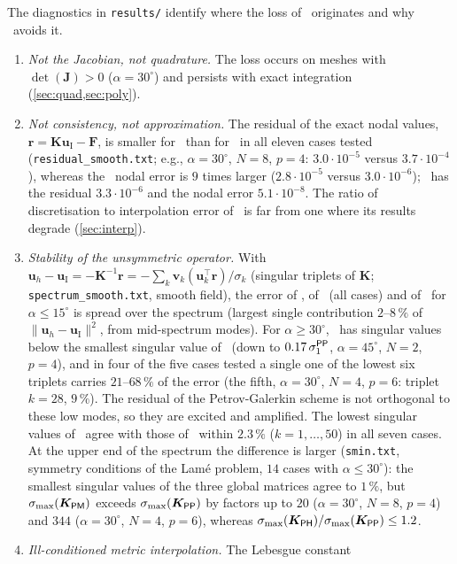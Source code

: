 The diagnostics in \texttt{results/} identify where the loss of \PM\ originates and why \PH\
avoids it.
\begin{enumerate}
\item \emph{Not the Jacobian, not quadrature.} The loss occurs on meshes with
  $\det(\bm J)>0$ ($\alpha=30^\circ$) and persists with exact integration
  (\cref{sec:quad,sec:poly}).
\item \emph{Not consistency, not approximation.} The residual of the exact nodal values,
  $\bm r=\bm K\bm u_{\mathrm I}-\bm F$, is smaller for \PM\ than for \PP\ in all eleven cases tested
  (\texttt{residual\_smooth.txt}; e.g., $\alpha=30^\circ$, $N=8$, $p=4$: $3.0\cdot10^{-5}$ versus
  $3.7\cdot10^{-4}$), whereas the \PM\ nodal error is $9$ times larger ($2.8\cdot10^{-5}$ versus
  $3.0\cdot10^{-6}$); \PH\ has the residual $3.3\cdot10^{-6}$ and the nodal error $5.1\cdot10^{-8}$. The
  ratio of discretisation to interpolation error of \PM\ is far from one where its results
  degrade (\cref{sec:interp}).
\item \emph{Stability of the unsymmetric operator.} With $\bm u_h-\bm u_{\mathrm I}=-\bm K^{-1}\bm r=
  -\sum\limits_{k}\bm v_k(\bm u_k^\top\bm r)/\sigma_k$ (singular triplets of $\bm K$;
  \texttt{spectrum\_smooth.txt}, smooth field), the error of \PP, of \PH\ (all cases) and of \PM\
  for $\alpha\le15^\circ$ is spread over the spectrum (largest single contribution $2$--$8\,\%$ of
  $\|\bm u_h-\bm u_{\mathrm I}\|^2$, from mid-spectrum modes). For $\alpha\ge30^\circ$, \PM\ has singular
  values below the smallest singular value of \PP\ (down to $0.17\,\sigma_1^{\textsf{PP}}$, $\alpha=45^\circ$,
  $N=2$, $p=4$), and in four of the five cases tested a single one of the lowest six triplets
  carries $21$--$68\,\%$ of the error (the fifth, $\alpha=30^\circ$, $N=4$, $p=6$: triplet $k=28$,
  $9\,\%$). The residual of the Petrov-Galerkin scheme is not orthogonal to these low modes,
  so they are excited and amplified. The lowest singular values of \PH\ agree with those of \PP\
  within $2.3\,\%$ ($k=1,\dots,50$) in all seven cases. At the upper end of the spectrum the
  difference is larger (\texttt{smin.txt}, symmetry conditions of the Lam\'e problem, $14$
  cases with $\alpha\le30^\circ$): the smallest singular values of the three global matrices
  agree to $1\,\%$, but $\sigma_{\max}(\bm K_{\textsf{PM}})$ exceeds $\sigma_{\max}(\bm K_{\textsf{PP}})$ by factors
  up to $20$ ($\alpha=30^\circ$, $N=8$, $p=4$) and $344$ ($\alpha=30^\circ$, $N=4$, $p=6$), whereas
  $\sigma_{\max}(\bm K_{\textsf{PH}})/\sigma_{\max}(\bm K_{\textsf{PP}})\le1.2$.
\item \emph{Ill-conditioned metric interpolation.} The Lebesgue constant

\end{enumerate}
